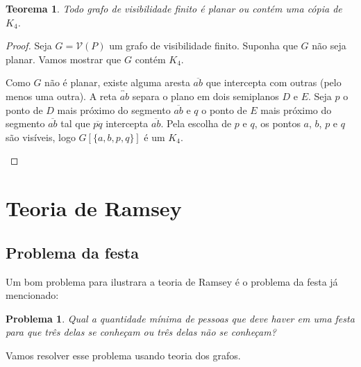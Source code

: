 \documentclass[a4paper]{book}
\newtheorem{problem}{Problema}
\newtheorem{teorema}{Teorema}
\begin{document}
\begin{teorema}\cite{visibility}\label{planork4}
    Todo grafo de visibilidade finito é planar ou contém uma cópia de $K_4$.
\end{teorema}
\begin{proof}
    Seja $G=\mathcal V(P)$ um grafo de visibilidade finito. Suponha que $G$ não seja planar. Vamos mostrar que $G$ contém $K_4$.

    Como $G$ não é planar, existe alguma aresta $\overline{ab}$ que intercepta com outras (pelo menos uma outra). A reta $\overleftrightarrow{ab}$ separa o plano em dois semiplanos $D$ e $E$. Seja $p$ o ponto de $D$ mais próximo do segmento $\overline{ab}$ e $q$ o ponto de $E$ mais próximo do segmento $\overline{ab}$ tal que $\overline{pq}$ intercepta $\overline{ab}$. Pela escolha de $p$ e $q$, os pontos $a$, $b$, $p$ e $q$ são visíveis, logo $G[\{a,b,p,q\}]$ é um $K_4$.
    \begin{center}
    \end{center}
\end{proof}

\section {Teoria de Ramsey}

\subsection {Problema da festa}
Um bom problema para ilustrara a teoria de Ramsey é o problema da festa já mencionado:

\begin{problem}
    Qual a quantidade mínima de pessoas que deve haver em uma festa para que três delas se conheçam ou três delas não se conheçam?
\end{problem}

Vamos resolver esse problema usando teoria dos grafos.
\end{document}
